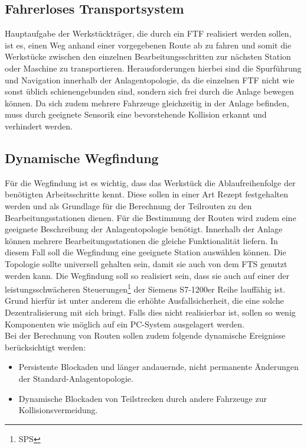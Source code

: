 \subsection{Fahrerloses Transportsystem}

	Hauptaufgabe der Werkstückträger, die durch ein \ac{FTF} realisiert werden sollen, ist es, einen Weg anhand einer vorgegebenen Route ab zu fahren und somit die Werkstücke zwischen den einzelnen Bearbeitungsschritten zur nächsten Station oder Maschine zu transportieren. Herausforderungen hierbei sind die Spurführung und Navigation innerhalb der Anlagentopologie, da die einzelnen \ac{FTF} nicht wie sonst üblich schienengebunden sind, sondern sich frei durch die Anlage bewegen können. Da sich zudem mehrere Fahrzeuge gleichzeitig in der Anlage befinden, muss durch geeignete Sensorik eine bevorstehende Kollision erkannt und verhindert werden.
	
\subsection{Dynamische Wegfindung}
	\label{Aufgabenstellung_Pathfinding}
	Für die Wegfindung ist es wichtig, dass das Werkstück die Ablaufreihenfolge der benötigten Arbeitsschritte kennt. Diese sollen in einer Art Rezept festgehalten werden und als Grundlage für die Berechnung der Teilrouten zu den Bearbeitungsstationen dienen. Für die Bestimmung der Routen wird zudem eine geeignete Beschreibung der Anlagentopologie benötigt. Innerhalb der Anlage können mehrere Bearbeitungsstationen die gleiche Funktionalität liefern. In diesem Fall soll die Wegfindung eine geeignete Station auswählen können. Die Topologie sollte universell gehalten sein, damit sie auch von dem \ac{FTS} genutzt werden kann. Die Wegfindung soll so realisiert sein, dass sie auch auf einer der leistungsschwächeren Steuerungen\footnote{\ac{SPS}} der Siemens S7-1200er Reihe lauffähig ist. Grund hierfür ist unter anderem die erhöhte Ausfallsicherheit, die eine solche Dezentralisierung mit sich bringt. Falls dies nicht realisierbar ist, sollen so wenig Komponenten wie möglich auf ein PC-System ausgelagert werden.
	\\[4pt]
	Bei der Berechnung von Routen sollen zudem folgende dynamische Ereignisse berücksichtigt werden:
	\begin{itemize}
		\item Persistente Blockaden und länger andauernde, nicht permanente Änderungen der Standard-Anlagentopologie.
		\item Dynamische Blockaden von Teilstrecken durch andere Fahrzeuge zur Kollisionsvermeidung.
	\end{itemize}
	

